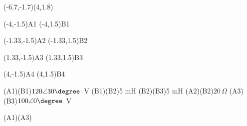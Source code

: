 \pspicture*(-6.7,-1.7)(4,1.8)


\pnode(-4,-1.5){A1}
\pnode(-4,1.5){B1}

\pnode(-1.33,-1.5){A2}
\pnode(-1.33,1.5){B2}

\pnode(1.33,-1.5){A3}
\pnode(1.33,1.5){B3}

\pnode(4,-1.5){A4}
\pnode(4,1.5){B4}

\Ucc[labelInside=2,labeloffset=16mm](A1)(B1){$120\angle30\degree$~V}
\coil[dipolestyle=elektor,labeloffset=-3mm](B1)(B2){5 mH}
\coil[dipolestyle=elektor,labeloffset=-3mm](B2)(B3){5 mH}
\resistor[labeloffset=8mm](A2)(B2){$20\,\Omega$}
\Ucc[labelInside=2,labeloffset=-15mm](A3)(B3){$100\angle0\degree$~V}

\wire(A1)(A3)

\endpspicture